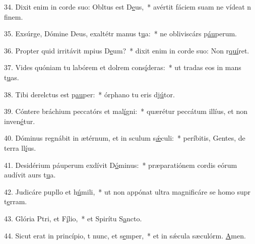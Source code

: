 34. Dixit enim in corde suo: Obltus est D\uline{e}us,~* avértit fáciem suam ne vídeat n f\uline{i}nem.\par 
35. Exsúrge, Dómine Deus, exaltétr manus t\uline{u}a:~* ne obliviscárs p\uline{áu}perum.\par 
36. Propter quid irritávit mpius D\uline{e}um?~* dixit enim in corde suo: Non r\uline{quí}ret.\par 
37. Vides quóniam tu labórem et dolrem cons\uline{í}deras:~* ut tradas eos in mans t\uline{u}as.\par 
38. Tibi derelctus est p\uline{au}per:~* órphano tu eris dj\uline{ú}tor.\par 
39. Cóntere bráchium peccatórs et mal\uline{í}gni:~* quærétur peccátum illíus, et non inven\uline{é}tur.\par 
40. Dóminus regnábit in ætérnum, et in sculum s\uline{ǽ}culi:~* períbitis, Gentes, de terra ll\uline{í}us.\par 
41. Desidérium páuperum exdívit D\uline{ó}minus:~* præparatiónem cordis eórum audívit aurs t\uline{u}a.\par 
42. Judicáre pupllo et h\uline{ú}mili,~* ut non appónat ultra magnificáre se homo supr t\uline{e}rram.\par 
43. Glória Ptri, et F\uline{í}lio,~* et Spirítu S\uline{a}ncto.\par 
44. Sicut erat in princípio, t nunc, et s\uline{e}mper,~* et in sǽcula sæculórm. \uline{A}men.\par 
